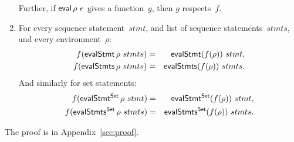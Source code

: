 \begin{prop}
\begin{enumerate}
Further, if $\mathop{\sf eval} \rho ~ e$ gives a function~$g$, then $g$ respects~$f$. 

\item\label{item:evalStmts} For every sequence statement~$stmt$, and list
  of sequence statements~$stmts$, and every environment~$\rho$:
\begin{eqnarray*}
f (\mathop{\sf evalStmt} \rho ~ stmts) & = & \mathop{\sf evalStmt} (f(\rho))~stmt, \\
f (\mathop{\sf evalStmts} \rho ~ stmts) & = & \mathop{\sf evalStmts} (f(\rho))~stmts.
\end{eqnarray*}
%
And similarly for set statements:
%
\begin{eqnarray*}
f (\mathop{\sf evalStmt^{Set}} \rho ~ stmt) & = & \mathop{\sf evalStmt^{Set}} (f(\rho))~stmt, \\
f (\mathop{\sf evalStmts^{Set}} \rho ~ stmts) & = & \mathop{\sf evalStmts^{Set}} (f(\rho))~stmts.
\end{eqnarray*}
%

\end{enumerate}

\end{prop}
%
The proof is in Appendix~\ref{sec:proof}.

